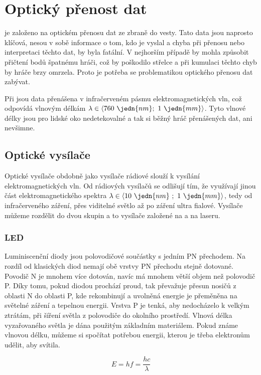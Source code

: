 \section{Optický přenost dat}
 je založeno na optickém přenosu dat ze zbraně do vesty. Tato data jsou naprosto klíčová, nesou v sobě informace o tom, kdo je vyslal a chyba při přenosu nebo interpretaci těchto dat, by byla fatální. V nejhorším případě by mohla způsobit přičtení bodů špatnému hráči, což by poškodilo střelce a při kumulaci těchto chyb by  hráče brzy omrzela. Proto je potřeba se problematikou optického přenosu dat zabývat.

Při  jsou data přenášena v infračerveném pásmu elektromagnetických vln, což odpovídá vlnovým délkám $\lambda \in \langle 760~\jedn{nm};~1~\jedn{mm}\rangle$. Tyto vlnové délky jsou pro lidské oko nedetekovalné a tak si běžný hráč přenášených dat, ani nevšimne.

\subsection{Optické vysílače}
Optické vysílače obdobně jako vysílače rádiové slouží k vysílání elektromagnetických vln. Od rádiových vysílačů  se odlišují tím, že využívají jinou část elektromagnetického spektra $\lambda \in \langle 10~\jedn{nm}~;~1~\jedn{mm}  \rangle$, tedy od infračerveného záření, přes viditelné světlo až po záření ultra fialové. Vysílače můžeme rozdělit do dvou skupin a to vysílače založené na  a na laseru.

\subsubsection{LED}
Luminiscenční diody jsou polovodičové součástky s jedním PN přechodem. Na rozdíl od klasických diod nemají  obě vrstvy PN přechodu stejně dotované. Povodič N je mnohem více dotován, navíc má mnohem větší objem než polovodič P. Díky tomu, pokud diodou prochází proud, tak převažuje přesun nosičů z oblasti N do oblasti P, kde rekombinují a uvolněná energie je přeměněna na světelné záření a tepelnou energii. Vrstva P je tenká, aby nedocházelo k velkým ztrátám, při šíření světla z polovodiče do okolního prostředí. Vlnová délka vyzařovaného světla je dána použitým základním materiálem. Pokud známe vlnovou délku, můžeme si spočítat potřebou energii, kterou je třeba elektronům udělit, aby  svítila.

$$ E = hf = \dfrac{hc}{\lambda} $$

